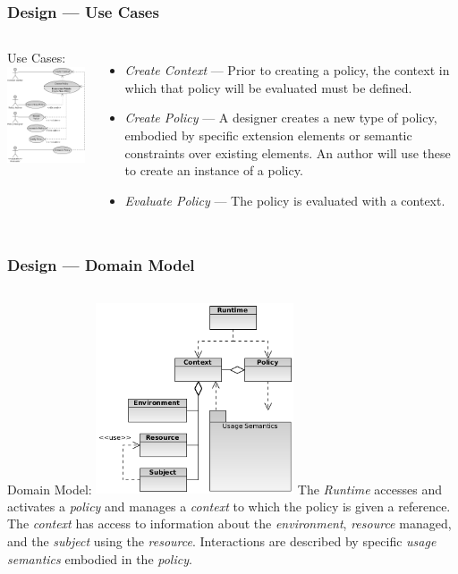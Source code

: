 \documentclass[t, xcolor=dvipsnames, handout, 10pt]{beamer}
\begin{document}
\begin{frame}[t]
\frametitle{Design --- Use Cases}
\begin{columns}[t]
Use Cases:
\includegraphics[width=2.3in]{use-cases}
\begin{itemize}
\item<2-> \textit{Create Context} --- Prior to creating a policy, the context in which that policy will be evaluated must be defined.
\item<3-> \textit{Create Policy} --- A designer creates a new type of policy, embodied by specific extension elements or semantic constraints over existing elements.  An author will use these to create an instance of a policy.
\item<4-> \textit{Evaluate Policy} --- The policy is evaluated with a context.
\end{itemize}
\end{columns}
\end{frame}

\begin{frame}[t]
\frametitle{Design --- Domain Model}
\begin{columns}[t]
Domain Model:
\includegraphics[width=2.3in]{ontology}
\pause
The \textit{Runtime} accesses and activates a \textit{policy} and manages a \textit{context} to which the policy is given a reference.
\newline
\newline
\pause
The \textit{context} has access to information about the \textit{environment}, \textit{resource} managed, and the \textit{subject} using the \textit{resource}. 
\newline
\newline
\pause
Interactions are described by specific \textit{usage semantics} embodied in the \textit{policy}.
\end{columns}
\end{frame}
\end{document}

